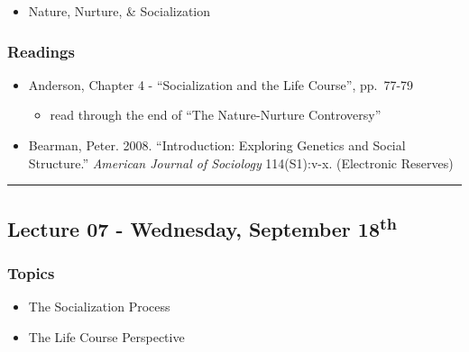 \documentclass[]{book}
\providecommand{\tightlist}{%
  \setlength{\itemsep}{0pt}\setlength{\parskip}{0pt}}
\begin{document}
\begin{itemize}
\tightlist
\item
  Nature, Nurture, \& Socialization
\end{itemize}

\hypertarget{readings-6}{%
\subsubsection*{Readings}\label{readings-6}}

\begin{itemize}
\tightlist
\item
  Anderson, Chapter 4 - ``Socialization and the Life Course'', pp.~77-79

  \begin{itemize}
  \tightlist
  \item
    read through the end of ``The Nature-Nurture Controversy''
  \end{itemize}
\item
  Bearman, Peter. 2008. ``Introduction: Exploring Genetics and Social Structure.'' \emph{American Journal of Sociology} 114(S1):v-x. (Electronic Reserves)
\end{itemize}

\begin{center}\rule{0.5\linewidth}{\linethickness}\end{center}

\hypertarget{lecture-07---wednesday-september-18th}{%
\subsection*{\texorpdfstring{Lecture 07 - Wednesday, September 18\textsuperscript{th}}{Lecture 07 - Wednesday, September 18th}}\label{lecture-07---wednesday-september-18th}}

\hypertarget{topics-7}{%
\subsubsection*{Topics}\label{topics-7}}

\begin{itemize}
\tightlist
\item
  The Socialization Process
\item
  The Life Course Perspective
\end{itemize}
\end{document}
